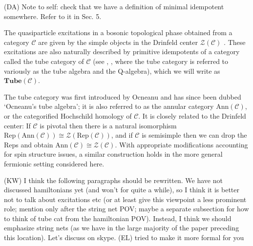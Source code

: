 \documentclass[12pt,a4paper]{article}
\newcommand{\mcz}{\mathcal{Z}}
\newcommand{\mcc}{\mathcal{C}}
\newcommand{\tube}{\textbf{Tube}}
\newcommand{\kw}[1]{{\color{kwcolor}\footnotesize{(KW) #1}}}
\newcommand{\dave}[1]{{\color{ao(english)}\footnotesize{(DA) #1}}}
\newcommand{\ethan}[1]{{\color{amethyst}\footnotesize{(EL) #1}}}
\begin{document}
\dave{Note to self: check that we have a definition of minimal idempotent somewhere.
Refer to it in Sec. 5.}

The quasiparticle excitations in a bosonic topological phase obtained from a category $\mcc$ 
are given by the simple objects in the Drinfeld center $\mcz(\mcc)$ \cite{levin2005}.
These excitations are also naturally described by primitive idempotents of a category called the tube category of $\mcc$ (see \cite{ocneanu2001,evans1995,Izumi2000,muger2003b,Bultinck2017}, \cite{Lan2014, Hu2015}, 
where the tube category is referred to variously as the tube algebra and the Q-algebra), 
which we will write as $\tube(\mcc)$.

The tube category was first introduced by Ocneanu \cite{ocneanu1994} and has since 
been dubbed `Ocneanu's tube algebra'; it is also referred to as the annular category $\text{Ann}(\mcc)$, 
or the categorified Hochschild homology of $\mcc$.
It is closely related to the Drinfeld center:
If $\mcc$ is pivotal then there is a natural isomorphism
$\text{Rep}(\text{Ann}(\mcc)) \cong \mcz(\text{Rep}(\mcc))$, and if $\mcc$ is semisimple then we can drop
the $\text{Rep}$s and obtain $\text{Ann}(\mcc) \cong \mcz(\mcc)$.
With appropriate modifications accounting for spin structure issues, a similar construction holds 
in the more general fermionic setting considered here. 


\kw{I think the following paragraphs should be rewritten.
We have not discussed hamiltonians yet (and won't for quite a while), so I think it is better not to talk about
excitations etc (or at least give this viewpoint a less prominent role; mention only after the string net POV;
maybe a separate subsection for how to think of tube cat from the hamiltonian POV).
Instead, I think we should emphasize string nets (as we have in the large majority of the paper
preceding this location).
Let's discuss on skype.}
\ethan{tried to make it more formal for you}
\end{document}
